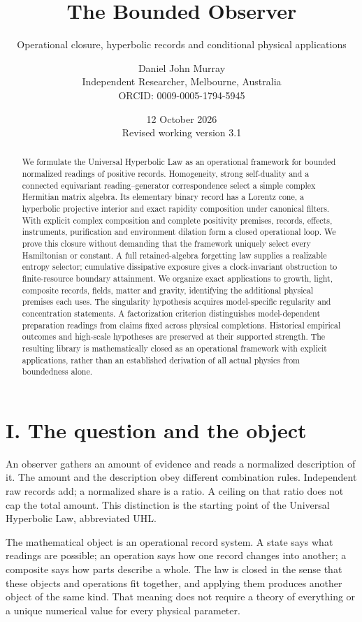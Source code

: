 \documentclass[
  11pt,
  a4paper,
]{article}
\title{The Bounded Observer}
\subtitle{Operational closure, hyperbolic records and conditional physical applications}
\author{Daniel John Murray\\{\small Independent Researcher, Melbourne, Australia}\\{\small ORCID: 0009-0005-1794-5945}}
\date{12 October 2026\\{\small Revised working version 3.1}}
\begin{document}
\maketitle
\begin{abstract}
We formulate the Universal Hyperbolic Law as an operational framework for bounded normalized readings of positive records. Homogeneity, strong self-duality and a connected equivariant reading--generator correspondence select a simple complex Hermitian matrix algebra. Its elementary binary record has a Lorentz cone, a hyperbolic projective interior and exact rapidity composition under canonical filters. With explicit complex composition and complete positivity premises, records, effects, instruments, purification and environment dilation form a closed operational loop. We prove this closure without demanding that the framework uniquely select every Hamiltonian or constant. A full retained-algebra forgetting law supplies a realizable entropy selector; cumulative dissipative exposure gives a clock-invariant obstruction to finite-resource boundary attainment. We organize exact applications to growth, light, composite records, fields, matter and gravity, identifying the additional physical premises each uses. The singularity hypothesis acquires model-specific regularity and concentration statements. A factorization criterion distinguishes model-dependent preparation readings from claims fixed across physical completions. Historical empirical outcomes and high-scale hypotheses are preserved at their supported strength. The resulting library is mathematically closed as an operational framework with explicit applications, rather than an established derivation of all actual physics from boundedness alone.
\end{abstract}

\section{I. The question and the object}\label{i.-the-question-and-the-object}

An observer gathers an amount of evidence and reads a normalized description of it. The amount and the description obey different combination rules. Independent raw records add; a normalized share is a ratio. A ceiling on that ratio does not cap the total amount. This distinction is the starting point of the Universal Hyperbolic Law, abbreviated UHL.

The mathematical object is an operational record system. A state says what readings are possible; an operation says how one record changes into another; a composite says how parts describe a whole. The law is closed in the sense that these objects and operations fit together, and applying them produces another object of the same kind. That meaning does not require a theory of everything or a unique numerical value for every physical parameter.
\end{document}
